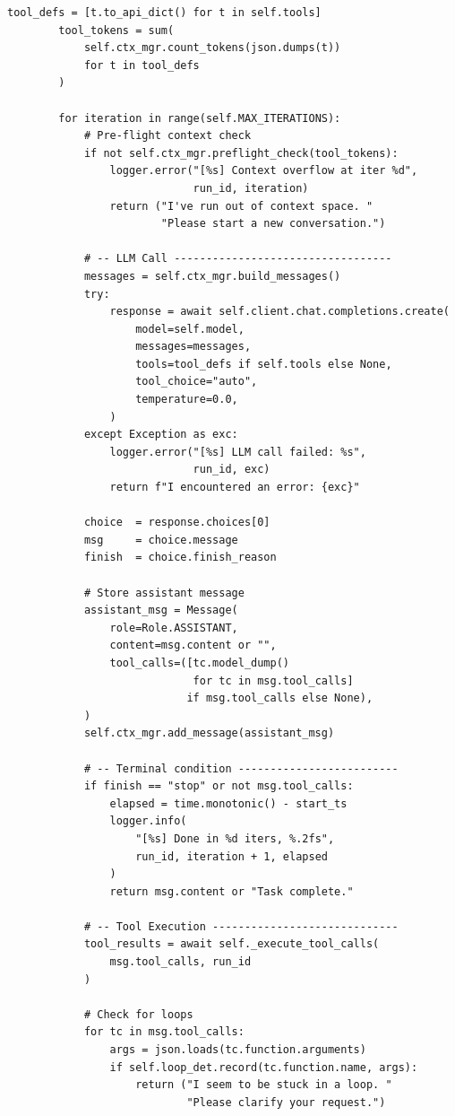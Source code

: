 \begin{lstlisting}[style=pythonstyle, caption={Production Agent Harness -- Core Implementation}]
        tool_defs = [t.to_api_dict() for t in self.tools]
        tool_tokens = sum(
            self.ctx_mgr.count_tokens(json.dumps(t))
            for t in tool_defs
        )

        for iteration in range(self.MAX_ITERATIONS):
            # Pre-flight context check
            if not self.ctx_mgr.preflight_check(tool_tokens):
                logger.error("[%s] Context overflow at iter %d",
                             run_id, iteration)
                return ("I've run out of context space. "
                        "Please start a new conversation.")

            # -- LLM Call ----------------------------------
            messages = self.ctx_mgr.build_messages()
            try:
                response = await self.client.chat.completions.create(
                    model=self.model,
                    messages=messages,
                    tools=tool_defs if self.tools else None,
                    tool_choice="auto",
                    temperature=0.0,
                )
            except Exception as exc:
                logger.error("[%s] LLM call failed: %s",
                             run_id, exc)
                return f"I encountered an error: {exc}"

            choice  = response.choices[0]
            msg     = choice.message
            finish  = choice.finish_reason

            # Store assistant message
            assistant_msg = Message(
                role=Role.ASSISTANT,
                content=msg.content or "",
                tool_calls=([tc.model_dump()
                             for tc in msg.tool_calls]
                            if msg.tool_calls else None),
            )
            self.ctx_mgr.add_message(assistant_msg)

            # -- Terminal condition -------------------------
            if finish == "stop" or not msg.tool_calls:
                elapsed = time.monotonic() - start_ts
                logger.info(
                    "[%s] Done in %d iters, %.2fs",
                    run_id, iteration + 1, elapsed
                )
                return msg.content or "Task complete."

            # -- Tool Execution -----------------------------
            tool_results = await self._execute_tool_calls(
                msg.tool_calls, run_id
            )

            # Check for loops
            for tc in msg.tool_calls:
                args = json.loads(tc.function.arguments)
                if self.loop_det.record(tc.function.name, args):
                    return ("I seem to be stuck in a loop. "
                            "Please clarify your request.")


\end{lstlisting}
